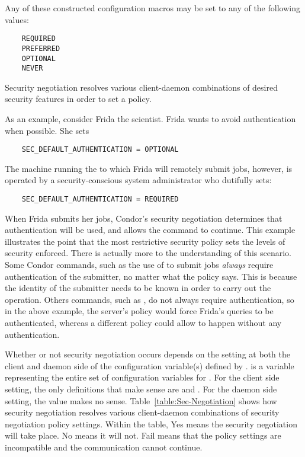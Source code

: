 Any of these constructed configuration macros may be set to
any of the following values:
\begin{verbatim}
    REQUIRED
    PREFERRED
    OPTIONAL
    NEVER 
\end{verbatim}

Security negotiation resolves various client-daemon combinations
of desired security features in order to set a policy.

As an example, consider Frida the scientist.
Frida wants to avoid authentication when possible.
She sets
\begin{verbatim}
    SEC_DEFAULT_AUTHENTICATION = OPTIONAL
\end{verbatim}
The machine running the 
to which Frida will remotely submit jobs,
however,
is operated by a security-conscious system administrator who dutifully
sets:
\begin{verbatim}
    SEC_DEFAULT_AUTHENTICATION = REQUIRED
\end{verbatim}
When Frida submits her jobs, Condor's security negotiation determines
that authentication will be used, and allows the command to continue.
This example illustrates the point that the most restrictive
security policy sets the levels of security enforced.
There is actually more to the understanding of this scenario.
Some Condor commands, such as the use of 
to submit jobs \emph{always} require
authentication of the submitter, no matter what the policy says. 
This is because the identity
of the submitter needs to be known in order to carry out the operation.
Others commands, such as , do not always require
authentication, so in the above example, the server's policy would
force Frida's  queries to be authenticated, whereas a different
policy could allow  to happen without any authentication.


Whether or not security negotiation occurs depends on the
setting at both the client and daemon side of the 
configuration variable(s) defined by .
 is a variable representing
the entire set of configuration variables for .
For the client side setting,
the only definitions that make sense are  and .
For the daemon side setting,
the  value makes no sense.
Table~\ref{table:Sec-Negotiation} shows how security negotiation
resolves various client-daemon combinations of security negotiation policy
settings.
Within the table, Yes means the security negotiation will take place.
No means it will not.
Fail means that the policy settings are incompatible and the communication
cannot continue.

